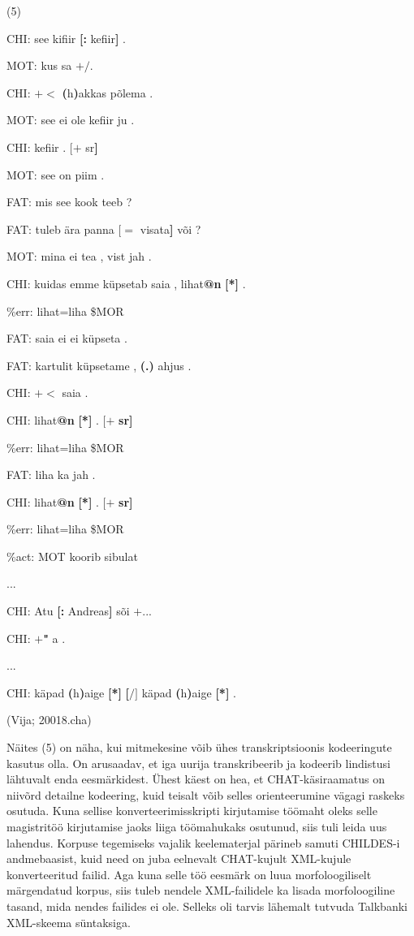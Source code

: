 \documentclass[12pt]{article}
\begin{document}
(5)
\begin{description}
    \item*CHI:   see kifiir \textbf{[:} kefiir\textbf{]} .
    \item*MOT:   kus sa $\pmb{+/}$.
    \item*CHI:   $\pmb{+<}$ \textbf{(}h\textbf{)}akkas põlema .
    \item*MOT:   see ei ole kefiir ju .
    \item*CHI:   kefiir . $\pmb{[+}$ sr\textbf{]}
    \item*MOT:   see on piim .
    \item*FAT:   mis see kook teeb ?
    \item*FAT:   tuleb ära panna $\pmb{[=}$ visata\textbf{]} või ?
    \item*MOT:   mina ei tea , vist jah .
    \item*CHI:   kuidas emme küpsetab saia , lihat\textbf{@n} \textbf{[*]} .
    \item\%err:   lihat=liha \$MOR
    \item*FAT:   saia ei ei küpseta .
    \item*FAT:   kartulit küpsetame , \textbf{(.)} ahjus .
    \item*CHI:   $\pmb{+<}$ saia .
    \item*CHI:   lihat\textbf{@n} \textbf{[*]} . $\pmb{[+}$ \textbf{sr]}
    \item\%err:   lihat=liha \$MOR
    \item*FAT:   liha ka jah .
    \item*CHI:   lihat\textbf{@n} \textbf{[*]} . $\pmb{[+}$ \textbf{sr]}
    \item\%err:   lihat=liha \$MOR
    \item\%act:   MOT koorib sibulat
    \item...
    \item*CHI:   Atu \textbf{[:} Andreas\textbf{]} sõi $\pmb{+...}$
    \item*CHI:   $\pmb{+}$\textbf{"} a .
    \item...
    \item*CHI:   käpad \textbf{(}h\textbf{)}aige \textbf{[*]} \textbf{[$\pmb{/]}$} käpad \textbf{(}h\textbf{)}aige \textbf{[*]} .
    \item (Vija; 20018.cha)
\end{description}


Näites (5) on näha, kui mitmekesine võib ühes transkriptsioonis kodeeringute kasutus olla. On arusaadav, et iga uurija transkribeerib ja kodeerib lindistusi lähtuvalt enda eesmärkidest. Ühest käest on hea, et CHAT-käsiraamatus on niivõrd detailne kodeering, kuid teisalt võib selles orienteerumine vägagi raskeks osutuda. Kuna sellise konverteerimisskripti kirjutamise töömaht oleks selle magistritöö kirjutamise jaoks liiga töömahukaks osutunud, siis tuli leida uus lahendus. Korpuse tegemiseks vajalik keelematerjal pärineb samuti CHILDES-i andmebaasist, kuid need on juba eelnevalt CHAT-kujult XML-kujule konverteeritud failid. Aga kuna selle töö eesmärk on luua morfoloogiliselt märgendatud korpus, siis tuleb nendele XML-failidele ka lisada morfoloogiline tasand, mida nendes failides ei ole. Selleks oli tarvis lähemalt tutvuda Talkbanki XML-skeema süntaksiga.
\end{document}
